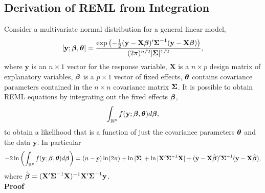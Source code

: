 \documentclass[12pt, titlepage]{article}
\begin{document}
\subsection{Derivation of REML from Integration}
\noindent
Consider a multivariate normal distribution for a general linear model,
\begin{equation} \label{eq:MVNdist}
[\mathbf{y};\boldsymbol{\beta},\boldsymbol{\theta}] = 
\frac{\exp\left(-\frac{1}{2}(\mathbf{y} - \mathbf{X}\boldsymbol{\beta})^{\prime}\mbox{\boldmath $\Sigma$}^{-1}(\mathbf{y} - \mathbf{X}\boldsymbol{\beta})\right)}{(2\pi)^{n/2}|\mbox{\boldmath $\Sigma$}|^{1/2}},
\end{equation}
where $\mathbf{y}$ is an $n \times 1$ vector for the response variable, $\mathbf{X}$ is a $n \times p$ design matrix of explanatory variables, $\boldsymbol{\beta}$ is a $p \times 1$ vector of fixed effects, $\boldsymbol{\theta}$ contains covariance parameters contained in the $n \times n$ covariance matrix $\mbox{\boldmath $\Sigma$}$. It is possible to obtain REML equations by integrating out the fixed effects $\boldsymbol{\beta}$,
$$
\int_{\mathbb{R}^p} f(\mathbf{y};\boldsymbol{\beta},\boldsymbol{\theta}) d\boldsymbol{\beta},
$$
to obtain a likelihood that is a function of just the covariance parameters $\boldsymbol{\theta}$ and the data $\mathbf{y}$.  In particular
$$
-2 \ln \left(\int_{\mathbb{R}^p} f(\mathbf{y};\boldsymbol{\beta},\boldsymbol{\theta}) d\boldsymbol{\beta} \right) = (n - p)\ln(2\pi) + \ln|\mbox{\boldmath $\Sigma$}| + \ln|\mathbf{X}^{\prime}\mbox{\boldmath $\Sigma$}^{-1}\mathbf{X}| + (\mathbf{y} - \mathbf{X}\hat{\boldsymbol{\beta}})^{\prime}\mbox{\boldmath $\Sigma$}^{-1}(\mathbf{y} - \mathbf{X}\hat{\boldsymbol{\beta}}),
$$
where $\hat{\boldsymbol{\beta}} = (\mathbf{X}^{\prime}\mbox{\boldmath $\Sigma$}^{-1}\mathbf{X})^{-1}\mathbf{X}^{\prime}\mbox{\boldmath $\Sigma$}^{-1}\mathbf{y}$. \\

{\large \flushleft \textbf{Proof}}
\end{document}
